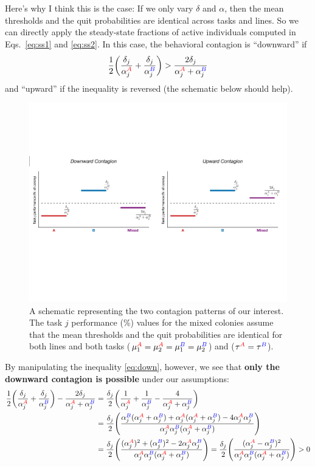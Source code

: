 \documentclass[10pt]{article}
\theoremstyle{remark}
\newcommand{\A}{{\color{red}A}}
\newcommand{\B}{{\color{blue}B}}
\begin{document}
Here's why I think this is the case: If we only vary $\delta$ and $\alpha$, then the mean thresholds and the quit probabilities are identical across tasks and lines. So we can directly apply the steady-state fractions of active individuals computed in Eqs.~\eqref{eq:ss1} and \eqref{eq:ss2}. In this case, the behavioral contagion is ``downward'' if
\begin{equation}
    \frac{1}{2} \bigg( \frac{\delta_j}{\alpha_j^{\A}} + \frac{\delta_j}{\alpha_j^{\B}} \bigg) > \frac{2\delta_j}{\alpha_j^{\A} + \alpha_j^{\B}} \label{eq:down}
\end{equation}
and ``upward'' if the inequality is reversed (the schematic below should help).
\begin{figure}[H]
    \centering
    \includegraphics[width=0.9\linewidth]{doc/schematic_contagion.pdf}
    \caption{A schematic representing the two contagion patterns of our interest. The task $j$ performance (\%) values for the mixed colonies assume that the mean thresholds and the quit probabilities are identical for both lines and both tasks ($\mu_1^{\A} = \mu_2^{\A} = \mu_1^{\B} = \mu_2^{\B}$) and ($\tau^{\A} = \tau^{\B}$).}
    \label{fig:schematic}
\end{figure}
By manipulating the inequality \eqref{eq:down}, however, we see that \textbf{only the downward contagion is possible} under our assumptions:
\begin{align}
    \frac{1}{2} \bigg( \frac{\delta_j}{\alpha_j^{\A}} + \frac{\delta_j}{\alpha_j^{\B}} \bigg) - \frac{2\delta_j}{\alpha_j^{\A} + \alpha_j^{\B}} 
    & = \frac{\delta_j}{2} \bigg( \frac{1}{\alpha_j^{\A}} + \frac{1}{\alpha_j^{\B}} - \frac{4}{\alpha_j^{\A} + \alpha_j^{\B}} \bigg) \nonumber\\
    & = \frac{\delta_j}{2} \Bigg( 
    \frac{\alpha_j^{\B} (\alpha_j^{\A} + \alpha_j^{\B}) + \alpha_j^{\A} (\alpha_j^{\A} + \alpha_j^{\B}) - 4\alpha_j^{\A}\alpha_j^{\B}}{\alpha_j^{\A}\alpha_j^{\B}(\alpha_j^{\A} + \alpha_j^{\B})} \Bigg) \nonumber\\
    & = \frac{\delta_j}{2} \Bigg( 
    \frac{ (\alpha_j^{\A})^2 + (\alpha_j^{\B})^2 - 2\alpha_j^{\A}\alpha_j^{\B}}{\alpha_j^{\A}\alpha_j^{\B}(\alpha_j^{\A} + \alpha_j^{\B})} \Bigg) 
    = \frac{\delta_j}{2} \Bigg( 
    \frac{ (\alpha_j^{\A} - \alpha_j^{\B})^2 }{\alpha_j^{\A}\alpha_j^{\B}(\alpha_j^{\A} + \alpha_j^{\B})} \Bigg) > 0
\end{align}
\end{document}
